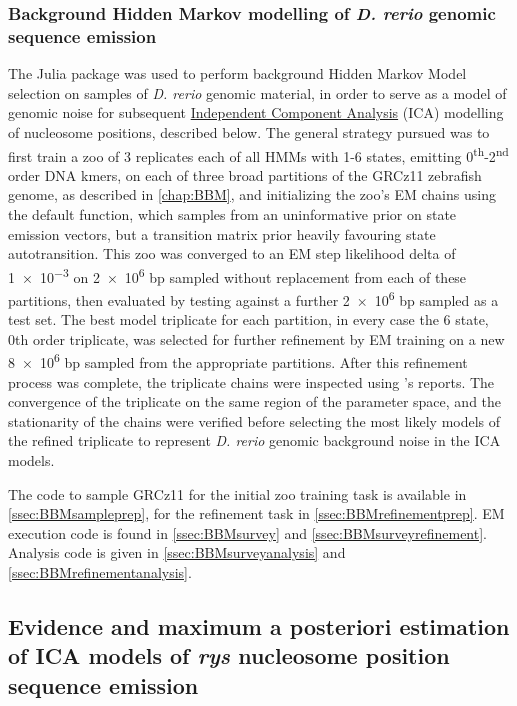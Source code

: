 \subsubsection{Background Hidden Markov modelling of \textit{D. rerio} genomic sequence emission}
The Julia package  was used to perform background Hidden Markov Model selection on samples of \textit{D. rerio} genomic material, in order to serve as a model of genomic noise for subsequent \hyperref[ICA]{Independent Component Analysis} (ICA) modelling of nucleosome positions, described below. The general strategy pursued was to first train a zoo of 3 replicates each of all HMMs with 1-6 states, emitting 0\textsuperscript{th}-2\textsuperscript{nd} order DNA kmers, on each of three broad partitions of the GRCz11 zebrafish genome, as described in \autoref{chap:BBM}, and initializing the zoo's EM chains using the default  function, which samples from an uninformative prior on state emission vectors, but a transition matrix prior heavily favouring state autotransition. This zoo was converged to an EM step likelihood delta of \num{1e-3} on \num{2e6} bp sampled without replacement from each of these partitions, then evaluated by testing against a further \num{2e6} bp sampled as a test set. The best model triplicate for each partition, in every case the 6 state, 0th order triplicate, was selected for further refinement by EM training on a new \num{8e6} bp sampled from the appropriate partitions. After this refinement process was complete, the triplicate chains were inspected using 's reports. The convergence of the triplicate on the same region of the parameter space, and the stationarity of the chains were verified before selecting the most likely models of the refined triplicate to represent \textit{D. rerio} genomic background noise in the  ICA models.

The code to sample GRCz11 for the initial zoo training task is available in \autoref{ssec:BBMsampleprep}, for the refinement task in \autoref{ssec:BBMrefinementprep}. EM execution code is found in \autoref{ssec:BBMsurvey} and \autoref{ssec:BBMsurveyrefinement}. Analysis code is given in \autoref{ssec:BBMsurveyanalysis} and \autoref{ssec:BBMrefinementanalysis}.

\subsection{Evidence and maximum a posteriori estimation of ICA models of \textit{rys} nucleosome position sequence emission}

